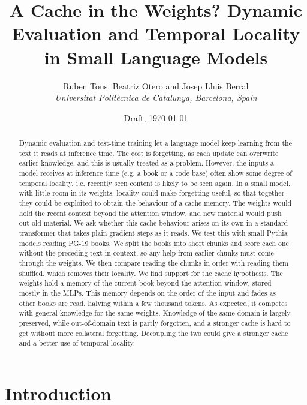 \documentclass[10pt]{article}
\title{A Cache in the Weights? Dynamic Evaluation and Temporal Locality in Small Language Models}
\author{Ruben Tous, Beatriz Otero and Josep Lluis Berral\\ \small{\textit{Universitat Politècnica de Catalunya, Barcelona, Spain}}}
\date{Draft, \today}
\begin{document}
\maketitle

\begin{abstract}
Dynamic evaluation and test-time training let a language model keep learning from the text it reads at inference time. The cost is forgetting, as each update can overwrite earlier knowledge, and this is usually treated as a problem. However, the inputs a model receives at inference time (e.g. a book or a code base) often show some degree of temporal locality, i.e. recently seen content is likely to be seen again. In a small model, with little room in its weights, locality could make forgetting useful, so that together they could be exploited to obtain the behaviour of a cache memory. The weights would hold the recent context beyond the attention window, and new material would push out old material. We ask whether this cache behaviour arises on its own in a standard transformer that takes plain gradient steps as it reads. We test this with small Pythia models reading PG-19 books. We split the books into short chunks and score each one without the preceding text in context, so any help from earlier chunks must come through the weights. We then compare reading the chunks in order with reading them shuffled, which removes their locality. We find support for the cache hypothesis. The weights hold a memory of the current book beyond the attention window, stored mostly in the MLPs. This memory depends on the order of the input and fades as other books are read, halving within a few thousand tokens. As expected, it competes with general knowledge for the same weights. Knowledge of the same domain is largely preserved, while out-of-domain text is partly forgotten, and a stronger cache is hard to get without more collateral forgetting. Decoupling the two could give a stronger cache and a better use of temporal locality.
\end{abstract}

\section{Introduction}
\end{document}
